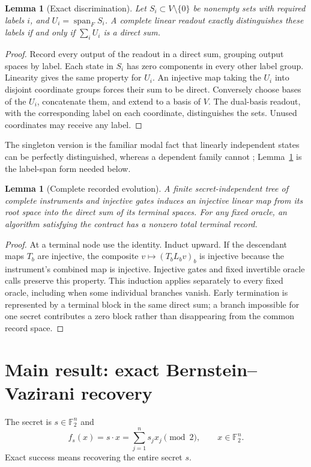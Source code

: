 \documentclass[11pt]{article}
\newtheorem{lemma}[theorem]{Lemma}
\newcommand{\F}{\mathbb F}
\DeclareMathOperator{\Span}{span}
\begin{document}
\begin{lemma}[Exact discrimination]\label{lem:discrimination}
Let $S_i\subset V\setminus\{0\}$ be nonempty sets with required labels $i$, and $U_i=\Span_F S_i$. A complete linear readout exactly distinguishes these labels if and only if $\sum_iU_i$ is a direct sum.
\end{lemma}
\begin{proof}
Record every output of the readout in a direct sum, grouping output spaces by label. Each state in $S_i$ has zero components in every other label group. Linearity gives the same property for $U_i$. An injective map taking the $U_i$ into disjoint coordinate groups forces their sum to be direct. Conversely choose bases of the $U_i$, concatenate them, and extend to a basis of $V$. The dual-basis readout, with the corresponding label on each coordinate, distinguishes the sets. Unused coordinates may receive any label.
\end{proof}
The singleton version is the familiar modal fact that linearly independent states can be perfectly distinguished, whereas a dependent family cannot \cite{Diamond2023}; Lemma~\ref{lem:discrimination} is the label-span form needed below.

\begin{lemma}[Complete recorded evolution]\label{lem:record}
A finite secret-independent tree of complete instruments and injective gates induces an injective linear map from its root space into the direct sum of its terminal spaces. For any fixed oracle, an algorithm satisfying the contract has a nonzero total terminal record.
\end{lemma}
\begin{proof}
At a terminal node use the identity. Induct upward. If the descendant maps $T_b$ are injective, the composite $v\mapsto(T_bL_bv)_b$ is injective because the instrument's combined map is injective. Injective gates and fixed invertible oracle calls preserve this property. This induction applies separately to every fixed oracle, including when some individual branches vanish. Early termination is represented by a terminal block in the same direct sum; a branch impossible for one secret contributes a zero block rather than disappearing from the common record space.
\end{proof}

\section{Main result: exact Bernstein--Vazirani recovery}\label{sec:bv}
The secret is $s\in\F_2^n$ and
\[
 f_s(x)=s\cdot x=\sum_{j=1}^n s_jx_j\pmod 2,
 \qquad x\in\F_2^n.
\]
Exact success means recovering the entire secret $s$.
\end{document}
